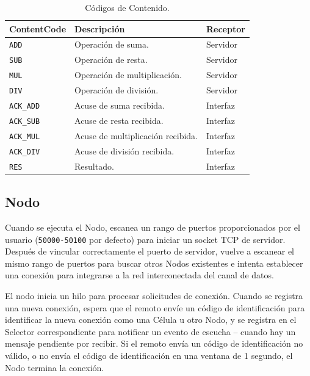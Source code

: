 \documentclass[conference,compsoc]{IEEEtran}
\begin{document}
\begin{table}[hb]
    \centering
    \caption{Códigos de Contenido.}
    \label{tab:cc}
    \begin{tabular}{|l|l|l|}
    \hline
    \textbf{ContentCode} & \textbf{Descripción}              & \textbf{Receptor} \\ \hline
    \texttt{ADD}         & Operación de suma.                & Servidor          \\ \hline
    \texttt{SUB}         & Operación de resta.               & Servidor          \\ \hline
    \texttt{MUL}         & Operación de multiplicación.      & Servidor          \\ \hline
    \texttt{DIV}         & Operación de división.            & Servidor          \\ \hline
    \texttt{ACK\_ADD}    & Acuse de suma recibida.           & Interfaz          \\ \hline
    \texttt{ACK\_SUB}    & Acuse de resta recibida.          & Interfaz          \\ \hline
    \texttt{ACK\_MUL}    & Acuse de multiplicación recibida. & Interfaz          \\ \hline
    \texttt{ACK\_DIV}    & Acuse de división recibida.       & Interfaz          \\ \hline
    \texttt{RES}         & Resultado.                        & Interfaz          \\ \hline
    \end{tabular}
\end{table}

\subsection{Nodo}

Cuando se ejecuta el Nodo, escanea un rango de puertos proporcionados por el usuario (\texttt{50000-50100} por defecto) para iniciar un socket TCP de servidor. Después de vincular correctamente el puerto de servidor, vuelve a escanear el mismo rango de puertos para buscar otros Nodos existentes e intenta establecer una conexión para integrarse a la red interconectada del canal de datos.

El nodo inicia un hilo para procesar solicitudes de conexión. Cuando se registra una nueva conexión, espera que el remoto envíe un código de identificación para identificar la nueva conexión como una Célula u otro Nodo, y se registra en el Selector correspondiente para notificar un evento de escucha -- cuando hay un mensaje pendiente por recibir. Si el remoto envía un código de identificación no válido, o no envía el código de identificación en una ventana de 1 segundo, el Nodo termina la conexión.
\end{document}
